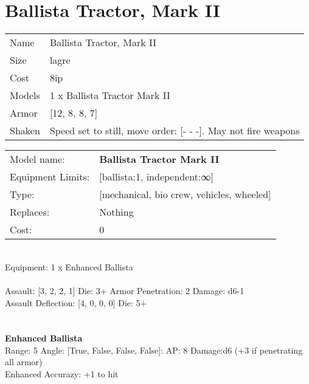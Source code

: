 \pagebreak\pagebreak

\section{ Ballista Tractor, Mark II }

\begin{tabular}{ll}
  Name & Ballista Tractor, Mark II \\
  Size & lagre\\
  Cost & 8ip\\
  Models & 1 x Ballista Tractor Mark II\\
  Armor & [12, 8, 8, 7]\\
  Shaken & Speed set to still, move order: [- - -]. May not fire weapons\\
\end{tabular}

\noindent 

\noindent
\begin{tabular}{ll}
Model name: &{\bf Ballista Tractor Mark II } \\
Equipment Limits: &[ballista:1, independent:∞] \\
Type: &[mechanical, bio crew, vehicles, wheeled] \\
Replaces: &Nothing \\
Cost: & 0\\
\end{tabular}
\ \\
Equipment: 1 x Enhanced Ballista \\
\ \\
Assault: [3, 2, 2, 1] Die: 3+ Armor Penetration: 2 Damage: d6-1 \\
Assault Deflection: [4, 0, 0, 0] Die: 5+\\
\indent  
\ \\

\ \\
{\bf Enhanced Ballista } \\



Range: 5  Angle: [True, False, False, False]: AP: 8 Damage:d6 (+3 if penetrating all armor) \\
Enhanced Accurazy: +1 to hit\\ 




 
\ \\



